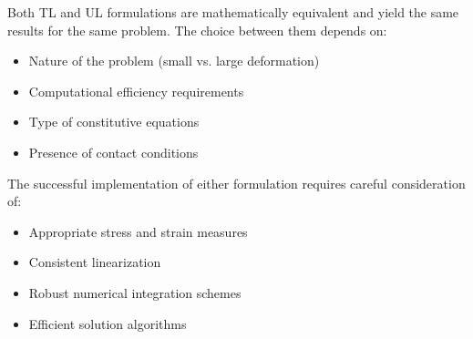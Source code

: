 \documentclass{article}
\begin{document}
Both TL and UL formulations are mathematically equivalent and yield the same results for the same problem. The choice between them depends on:
\begin{itemize}
    \item Nature of the problem (small vs. large deformation)
    \item Computational efficiency requirements
    \item Type of constitutive equations
    \item Presence of contact conditions
\end{itemize}

The successful implementation of either formulation requires careful consideration of:
\begin{itemize}
    \item Appropriate stress and strain measures
    \item Consistent linearization
    \item Robust numerical integration schemes
    \item Efficient solution algorithms
\end{itemize}
\end{document}
